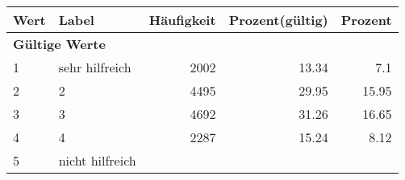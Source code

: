      \begin{longtable}{lXrrr}
     \toprule
     \textbf{Wert} & \textbf{Label} & \textbf{Häufigkeit} & \textbf{Prozent(gültig)} & \textbf{Prozent} \\
     \endhead
     \midrule
     \multicolumn{5}{l}{\textbf{Gültige Werte}}\\

     1 &
     \multicolumn{1}{X}{ sehr hilfreich   } &


       \num{2002} &
       \num[round-mode=places,round-precision=2]{13,34} &
         \num[round-mode=places,round-precision=2]{7,1} \\

     2 &
     \multicolumn{1}{X}{ 2   } &


       \num{4495} &
       \num[round-mode=places,round-precision=2]{29,95} &
         \num[round-mode=places,round-precision=2]{15,95} \\

     3 &
     \multicolumn{1}{X}{ 3   } &


       \num{4692} &
       \num[round-mode=places,round-precision=2]{31,26} &
         \num[round-mode=places,round-precision=2]{16,65} \\

     4 &
     \multicolumn{1}{X}{ 4   } &


       \num{2287} &
       \num[round-mode=places,round-precision=2]{15,24} &
         \num[round-mode=places,round-precision=2]{8,12} \\

     5 &
     \multicolumn{1}{X}{ nicht hilfreich   } &



\end{longtable}
